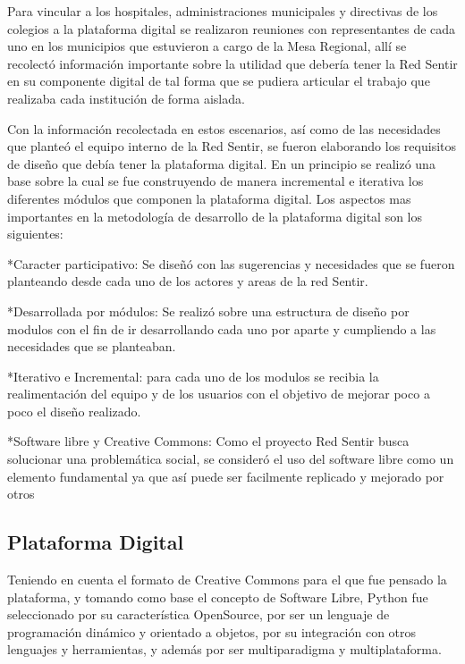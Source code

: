 \documentclass[journal,transmag]{IEEEtran}
\begin{document}
Para vincular a los hospitales, administraciones municipales y directivas de los colegios a la plataforma digital se realizaron reuniones con representantes de cada uno en los municipios que estuvieron a cargo de la Mesa Regional, allí se recolectó información importante sobre la utilidad que debería tener la Red Sentir en su componente digital de tal forma que se pudiera articular el trabajo que realizaba cada institución de forma aislada.

Con la información recolectada en estos escenarios, así como  de las necesidades que planteó el equipo interno de la Red Sentir, se fueron elaborando los requisitos de diseño que debía tener la plataforma digital. En un principio se realizó una base sobre la cual se fue construyendo de manera incremental e iterativa los diferentes módulos que componen la plataforma digital. Los aspectos mas importantes en la metodología de desarrollo de la plataforma digital son los siguientes:

*Caracter participativo: Se diseñó con las sugerencias y necesidades que se fueron planteando desde cada uno de los actores y areas de la red Sentir.

*Desarrollada por módulos: Se realizó sobre una estructura de diseño por modulos con el fin de ir desarrollando cada uno por aparte y cumpliendo a las necesidades que se planteaban.

*Iterativo e Incremental: para cada uno de los modulos se recibia la realimentación del equipo y de los usuarios con el objetivo de mejorar poco a poco el diseño realizado.

*Software libre y Creative Commons: Como el proyecto Red Sentir busca solucionar una problemática social, se consideró el uso del software libre como un elemento fundamental ya que así puede ser facilmente replicado y mejorado por otros










\subsection{Plataforma Digital}
Teniendo en cuenta el formato de Creative Commons para el que fue pensado la plataforma, y tomando como base el concepto de Software Libre, Python fue seleccionado por su característica OpenSource, por ser un lenguaje de programación dinámico y orientado a objetos, por su integración con otros lenguajes y herramientas, y además por ser multiparadigma y multiplataforma.
\end{document}

